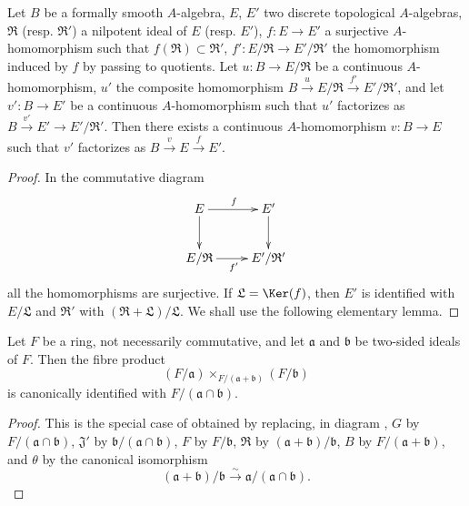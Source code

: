 \begin{lemma}[19.3.10.1]
\label{0.19.3.10.1}
Let $B$ be a formally smooth $A$-algebra, $E$, $E'$ two discrete topological $A$-algebras, $\mathfrak{R}$ (resp. $\mathfrak{R}'$) a nilpotent ideal of $E$ (resp. $E'$), $f:E\to E'$ a surjective $A$-homomorphism such that $f(\mathfrak{R})\subset\mathfrak{R}'$, $f':E/\mathfrak{R}\to E'/\mathfrak{R}'$ the homomorphism induced by $f$ by passing to quotients.
Let $u:B\to E/\mathfrak{R}$ be a continuous $A$-homomorphism, $u'$ the composite homomorphism $B\xrightarrow{u}E/\mathfrak{R}\xrightarrow{f'}E'/\mathfrak{R}'$, and let $v':B\to E'$ be a continuous $A$-homomorphism such that $u'$ factorizes as $B\xrightarrow{v'}E'\to E'/\mathfrak{R}'$.
Then there exists a continuous $A$-homomorphism $v:B\to E$ such that $v'$ factorizes as $B\xrightarrow{v}E\xrightarrow{f}E'$.
\end{lemma}

\begin{proof}
In the commutative diagram
\[
\xymatrix{
  E \ar[r]^f \ar[d] & E' \ar[d] \\
  E/\mathfrak{R} \ar[r]_{f'} & E'/\mathfrak{R}'
}
\]
all the homomorphisms are surjective.
If $\mathfrak{L}=\Ker(f)$, then $E'$ is identified with $E/\mathfrak{L}$ and $\mathfrak{R}'$ with $(\mathfrak{R}+\mathfrak{L})/\mathfrak{L}$.
We shall use the following elementary lemma.
\end{proof}

\begin{lemma}[19.3.10.2]
\label{0.19.3.10.2}
Let $F$ be a ring, not necessarily commutative, and let $\mathfrak{a}$ and $\mathfrak{b}$ be two-sided ideals of $F$.
Then the fibre product
\[
  (F/\mathfrak{a})\times_{F/(\mathfrak{a}+\mathfrak{b})}(F/\mathfrak{b})
\]
is canonically identified with $F/(\mathfrak{a}\cap\mathfrak{b})$.
\end{lemma}

\begin{proof}
This is the special case of  obtained by replacing, in diagram , $G$ by $F/(\mathfrak{a}\cap\mathfrak{b})$, $\mathfrak{J}'$ by $\mathfrak{b}/(\mathfrak{a}\cap\mathfrak{b})$, $F$ by $F/\mathfrak{b}$, $\mathfrak{R}$ by $(\mathfrak{a}+\mathfrak{b})/\mathfrak{b}$, $B$ by $F/(\mathfrak{a}+\mathfrak{b})$, and $\theta$ by the canonical isomorphism
\[
  (\mathfrak{a}+\mathfrak{b})/\mathfrak{b}\xrightarrow{\sim}\mathfrak{a}/(\mathfrak{a}\cap\mathfrak{b}).
\]
\end{proof}


